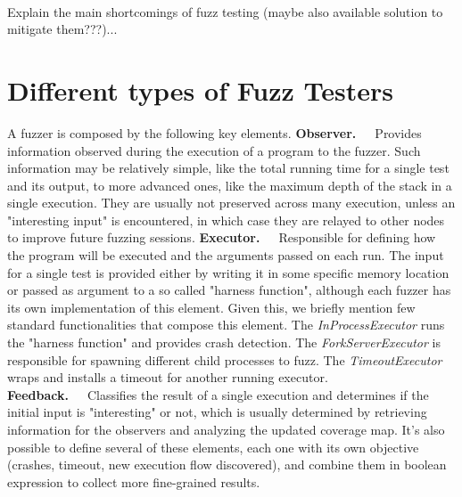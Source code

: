\documentclass[Lau,oneside]{sapthesis}%
\begin{document}
\ \\ \newline \newline
\newline \newline
Explain the main shortcomings of fuzz testing (maybe also available solution to mitigate them???)...



\newpage
\section{Different types of Fuzz Testers} \label{fuzzers}
A fuzzer is composed by the following key elements. \cite{ref:afl_docs}
\newline \newline
\textbf{Observer.}\ \ \ Provides information observed during the execution of a program to the fuzzer. Such information may be relatively simple, like the total running time for a single test and its output, to more advanced ones, like the maximum depth of the stack in a single execution. They are usually not preserved across many execution, unless an "interesting input" is encountered, in which case they are relayed to other nodes to improve future fuzzing sessions. 
\newline \newline
\textbf{Executor.}\ \ \ Responsible for defining how the program will be executed and the arguments passed on each run. The input for a single test is provided either by writing it in some specific memory location or passed as argument to a so called "harness function", although each fuzzer has its own implementation of this element. Given this, we briefly mention few standard functionalities that compose this element. The \textit{InProcessExecutor} runs the "harness function" and provides crash detection. The \textit{ForkServerExecutor} is responsible for spawning different child processes to fuzz. The \textit{TimeoutExecutor} wraps and installs a timeout for another running executor.
\newline \newline
\textbf{Feedback.}\ \ \ Classifies the result of a single execution and determines if the initial input is "interesting" or not, which is usually determined by retrieving information for the observers and analyzing the updated coverage map. It's also possible to define several of these elements, each one with its own objective (crashes, timeout, new execution flow discovered), and combine them in boolean expression to collect more fine-grained results.
\end{document}

